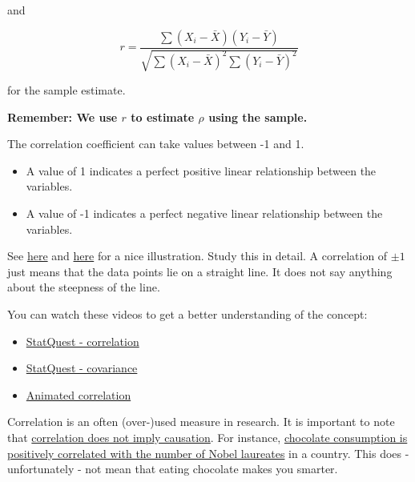 \documentclass[
]{book}
\begin{document}
and

\[r = \frac{\sum (X_i - \bar{X})(Y_i - \bar{Y})}{\sqrt{\sum (X_i - \bar{X})^2 \sum (Y_i - \bar{Y})^2}}\]

for the sample estimate.

\textbf{Remember: We use \(r\) to estimate \(\rho\) using the sample.}

The correlation coefficient can take values between -1 and 1.

\begin{itemize}
\item
  A value of 1 indicates a perfect positive linear relationship between the variables.
\item
  A value of -1 indicates a perfect negative linear relationship between the variables.
\end{itemize}

See \href{https://en.wikipedia.org/wiki/Correlation\#/media/File:Correlation_examples2.svg}{here} and
\href{https://en.wikipedia.org/wiki/Correlation\#/media/File:Pearson_Correlation_Coefficient_and_associated_scatterplots.png}{here}
for a nice illustration. Study this in detail. A correlation of \(\pm 1\) just means that the data points lie on a straight line.
It does not say anything about the steepness of the line.

You can watch these videos to get a better understanding of the concept:

\begin{itemize}
\item
  \href{https://www.youtube.com/watch?v=xZ_z8KWkhXE&ab_channel=StatQuestwithJoshStarmer}{StatQuest - correlation}
\item
  \href{https://www.youtube.com/watch?v=qtaqvPAeEJY&ab_channel=StatQuestwithJoshStarmer}{StatQuest - covariance}
\item
  \href{https://www.youtube.com/watch?v=rijqfllOq6g&ab_channel=3-MinuteDataScience}{Animated correlation}
\end{itemize}

Correlation is an often (over-)used measure in research.
It is important to note that
\href{https://en.wikipedia.org/wiki/Correlation_does_not_imply_causation}{correlation does not imply causation}.
For instance,
\href{https://www.sciencedirect.com/science/article/pii/S2590291120300711}{chocolate consumption is positively correlated with the number of Nobel laureates} in a country.
This does - unfortunately - not mean that eating chocolate makes you smarter.
\end{document}
